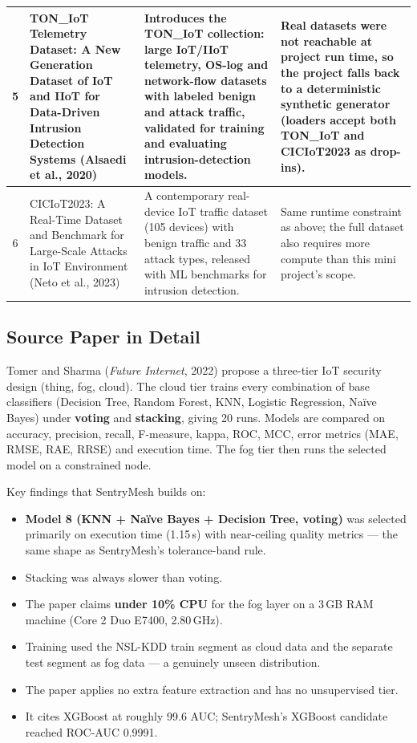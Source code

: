 \documentclass[12pt,a4paper]{article}
\begin{document}
\begin{longtable}{|c|p{2.3cm}|p{5.8cm}|p{5.0cm}|}
\hline
5 & TON\_IoT Telemetry Dataset: A New Generation Dataset of IoT and IIoT for Data-Driven Intrusion Detection Systems (Alsaedi et al., 2020) & Introduces the TON\_IoT collection: large IoT/IIoT telemetry, OS-log and network-flow datasets with labeled benign and attack traffic, validated for training and evaluating intrusion-detection models. & Real datasets were not reachable at project run time, so the project falls back to a deterministic synthetic generator (loaders accept both TON\_IoT and CICIoT2023 as drop-ins).\\
\hline
6 & CICIoT2023: A Real-Time Dataset and Benchmark for Large-Scale Attacks in IoT Environment (Neto et al., 2023) & A contemporary real-device IoT traffic dataset (105 devices) with benign traffic and 33 attack types, released with ML benchmarks for intrusion detection. & Same runtime constraint as above; the full dataset also requires more compute than this mini project's scope.\\
\end{longtable}
\endgroup

\subsection{Source Paper in Detail}
Tomer and Sharma (\textit{Future Internet}, 2022) propose a three-tier IoT security
design (thing, fog, cloud). The cloud tier trains every combination of base
classifiers (Decision Tree, Random Forest, KNN, Logistic Regression, Na\"ive Bayes)
under \textbf{voting} and \textbf{stacking}, giving 20 runs. Models are compared on
accuracy, precision, recall, F-measure, kappa, ROC, MCC, error metrics (MAE, RMSE,
RAE, RRSE) and execution time. The fog tier then runs the selected model on a
constrained node.

Key findings that SentryMesh builds on:
\begin{itemize}
  \item \textbf{Model 8 (KNN + Na\"ive Bayes + Decision Tree, voting)} was selected
        primarily on execution time (1.15\,s) with near-ceiling quality metrics ---
        the same shape as SentryMesh's tolerance-band rule.
  \item Stacking was always slower than voting.
  \item The paper claims \textbf{under 10\% CPU} for the fog layer on a 3\,GB RAM machine
        (Core 2 Duo E7400, 2.80\,GHz).
  \item Training used the NSL-KDD train segment as cloud data and the separate test
        segment as fog data --- a genuinely unseen distribution.
  \item The paper applies no extra feature extraction and has no unsupervised tier.
  \item It cites XGBoost at roughly 99.6 AUC; SentryMesh's XGBoost candidate reached
        ROC-AUC 0.9991.
\end{itemize}
\end{document}
